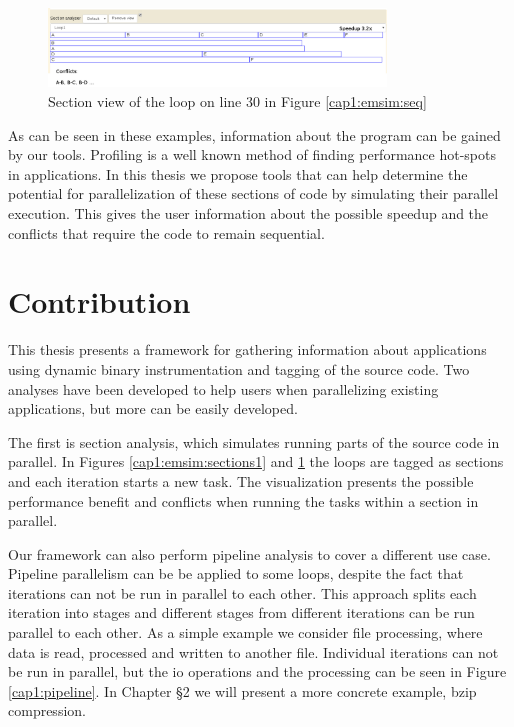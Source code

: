 \begin{figure}[!ht]
	\centering
	\includegraphics[width=0.8\textwidth]{loop2section}
	\caption{Section view of the loop on line 30 in Figure \ref{cap1:emsim:seq}}
	\label{cap1:emsim:sections2}
\end{figure}

As can be seen in these examples, information about the program can be gained by our tools. Profiling is a well known method of finding performance hot-spots in applications. In this thesis we propose tools that can help determine the potential for parallelization of these sections of code by simulating their parallel execution. This gives the user information about the possible speedup and the conflicts that require the code to remain sequential.

\section {Contribution}

This thesis presents a framework for gathering information about applications using dynamic binary instrumentation and tagging of the source code. Two analyses have been developed to help users when parallelizing existing applications, but more can be easily developed.

The first is section analysis, which simulates running parts of the source code in parallel. In Figures \ref{cap1:emsim:sections1} and \ref{cap1:emsim:sections2} the loops are tagged as sections and each iteration starts a new task. The visualization presents the possible performance benefit and conflicts when running the tasks within a section in parallel.

Our framework can also perform pipeline analysis to cover a different use case. Pipeline parallelism can be be applied to some loops, despite the fact that iterations can not be run in parallel to each other. This approach splits each iteration into stages and different stages from different iterations can be run parallel to each other. As a simple example we consider file processing, where data is read, processed and written to another file. Individual iterations can not be run in parallel, but the io operations and the processing can be seen in Figure \ref{cap1:pipeline}. In Chapter §2 we will present a more concrete example, bzip compression.

